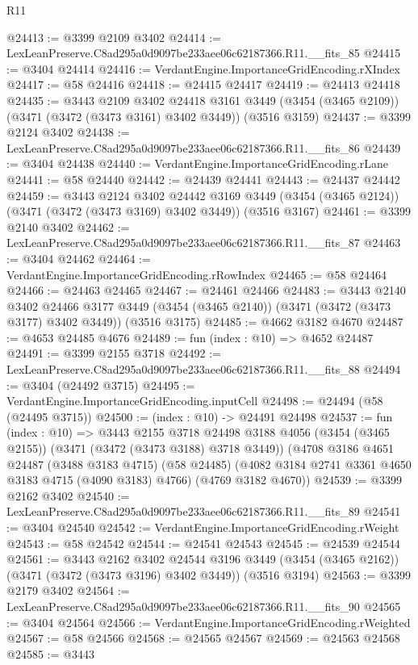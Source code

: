 \begin{lexlean}{R11}
\begin{coremodule}
@24413 := @3399 @2109 @3402
@24414 := LexLeanPreserve.C8ad295a0d9097be233aee06c62187366.R11.__fits_85
@24415 := @3404 @24414
@24416 := VerdantEngine.ImportanceGridEncoding.rXIndex
@24417 := @58 @24416
@24418 := @24415 @24417
@24419 := @24413 @24418
@24435 := @3443
    @2109
    @3402
    @24418
    @3161
    @3449
    (@3454 (@3465 @2109))
    (@3471 (@3472 (@3473 @3161) @3402 @3449))
    (@3516 @3159)
@24437 := @3399 @2124 @3402
@24438 := LexLeanPreserve.C8ad295a0d9097be233aee06c62187366.R11.__fits_86
@24439 := @3404 @24438
@24440 := VerdantEngine.ImportanceGridEncoding.rLane
@24441 := @58 @24440
@24442 := @24439 @24441
@24443 := @24437 @24442
@24459 := @3443
    @2124
    @3402
    @24442
    @3169
    @3449
    (@3454 (@3465 @2124))
    (@3471 (@3472 (@3473 @3169) @3402 @3449))
    (@3516 @3167)
@24461 := @3399 @2140 @3402
@24462 := LexLeanPreserve.C8ad295a0d9097be233aee06c62187366.R11.__fits_87
@24463 := @3404 @24462
@24464 := VerdantEngine.ImportanceGridEncoding.rRowIndex
@24465 := @58 @24464
@24466 := @24463 @24465
@24467 := @24461 @24466
@24483 := @3443
    @2140
    @3402
    @24466
    @3177
    @3449
    (@3454 (@3465 @2140))
    (@3471 (@3472 (@3473 @3177) @3402 @3449))
    (@3516 @3175)
@24485 := @4662 @3182 @4670
@24487 := @4653 @24485 @4676
@24489 := fun (index : @10) => @4652 @24487
@24491 := @3399 @2155 @3718
@24492 := LexLeanPreserve.C8ad295a0d9097be233aee06c62187366.R11.__fits_88
@24494 := @3404 (@24492 @3715)
@24495 := VerdantEngine.ImportanceGridEncoding.inputCell
@24498 := @24494 (@58 (@24495 @3715))
@24500 := (index : @10) -> @24491 @24498
@24537 := fun (index : @10) =>
  @3443
    @2155
    @3718
    @24498
    @3188
    @4056
    (@3454 (@3465 @2155))
    (@3471 (@3472 (@3473 @3188) @3718 @3449))
    (@4708
      @3186
      @4651
      @24487
      (@3488 @3183 @4715)
      (@58 @24485)
      (@4082 @3184 @2741 @3361 @4650 @3183 @4715 (@4090 @3183) @4766)
      (@4769 @3182 @4670))
@24539 := @3399 @2162 @3402
@24540 := LexLeanPreserve.C8ad295a0d9097be233aee06c62187366.R11.__fits_89
@24541 := @3404 @24540
@24542 := VerdantEngine.ImportanceGridEncoding.rWeight
@24543 := @58 @24542
@24544 := @24541 @24543
@24545 := @24539 @24544
@24561 := @3443
    @2162
    @3402
    @24544
    @3196
    @3449
    (@3454 (@3465 @2162))
    (@3471 (@3472 (@3473 @3196) @3402 @3449))
    (@3516 @3194)
@24563 := @3399 @2179 @3402
@24564 := LexLeanPreserve.C8ad295a0d9097be233aee06c62187366.R11.__fits_90
@24565 := @3404 @24564
@24566 := VerdantEngine.ImportanceGridEncoding.rWeighted
@24567 := @58 @24566
@24568 := @24565 @24567
@24569 := @24563 @24568
@24585 := @3443

\end{coremodule}
\end{lexlean}
